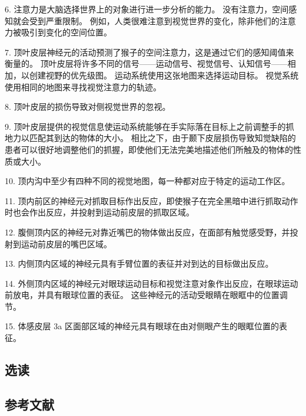 6. 注意力是大脑选择世界上的对象进行进一步分析的能力。 没有注意力，空间感知就会受到严重限制。 例如，人类很难注意到视觉世界的变化，除非他们的注意力被吸引到变化的空间位置。 

7. 顶叶皮层神经元的活动预测了猴子的空间注意力，这是通过它们的感知阈值来衡量的。 顶叶皮层将许多不同的信号——运动信号、视觉信号、认知信号——相加，以创建视野的优先级图。 运动系统使用这张地图来选择运动目标。 视觉系统使用相同的地图来寻找视觉注意力的轨迹。 

8. 顶叶皮层的损伤导致对侧视觉世界的忽视。 

9. 顶叶皮层提供的视觉信息使运动系统能够在手实际落在目标上之前调整手的抓地力以匹配其到达的物体的大小。 相比之下，由于颞下皮层损伤导致知觉缺陷的患者可以很好地调整他们的抓握，即使他们无法完美地描述他们所触及的物体的性质或大小。 

10. 顶内沟中至少有四种不同的视觉地图，每一种都对应于特定的运动工作区。 

11. 顶内前区的神经元对抓取目标作出反应，即使猴子在完全黑暗中进行抓取动作时也会作出反应，并投射到运动前皮层的抓取区域。 

12. 腹侧顶内区的神经元对靠近嘴巴的物体做出反应，在面部有触觉感受野，并投射到运动前皮层的嘴巴区域。 

13. 内侧顶内区域的神经元具有手臂位置的表征并对到达的目标做出反应。 

14. 外侧顶内区域的神经元对眼球运动目标和视觉注意对象作出反应，在眼球运动前放电，并具有眼球位置的表征。 这些神经元的活动受眼睛在眼眶中的位置调节。 

15. 体感皮层 3a 区面部区域的神经元具有眼球在由对侧眼产生的眼眶位置的表征。

\subsection{选读}
\subsection{参考文献}